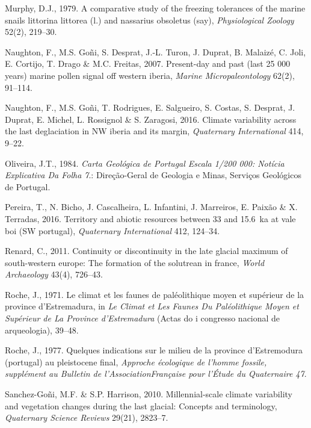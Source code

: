 \documentclass[12pt,twoside]{reedthesis}
\begin{document}
\leavevmode\hypertarget{ref-murphy1979}{}%
Murphy, D.J., 1979. A comparative study of the freezing tolerances of the marine snails littorina littorea (l.) and nassarius obsoletus (say), \emph{Physiological Zoology} 52(2), 219--30.

\leavevmode\hypertarget{ref-naughton2007}{}%
Naughton, F., M.S. Goñi, S. Desprat, J.-L. Turon, J. Duprat, B. Malaizé, C. Joli, E. Cortijo, T. Drago \& M.C. Freitas, 2007. Present-day and past (last 25 000 years) marine pollen signal off western iberia, \emph{Marine Micropaleontology} 62(2), 91--114.

\leavevmode\hypertarget{ref-naughton2016}{}%
Naughton, F., M.S. Goñi, T. Rodrigues, E. Salgueiro, S. Costas, S. Desprat, J. Duprat, E. Michel, L. Rossignol \& S. Zaragosi, 2016. Climate variability across the last deglaciation in NW iberia and its margin, \emph{Quaternary International} 414, 9--22.

\leavevmode\hypertarget{ref-oliveira1984}{}%
Oliveira, J.T., 1984. \emph{Carta Geológica de Portugal Escala 1/200 000: Notícia Explicativa Da Folha 7}.: Direção-Geral de Geologia e Minas, Serviços Geológicos de Portugal.

\leavevmode\hypertarget{ref-pereira2016}{}%
Pereira, T., N. Bicho, J. Cascalheira, L. Infantini, J. Marreiros, E. Paixão \& X. Terradas, 2016. Territory and abiotic resources between 33 and 15.6~ka at vale boi (SW portugal), \emph{Quaternary International} 412, 124--34.

\leavevmode\hypertarget{ref-renard2011}{}%
Renard, C., 2011. Continuity or discontinuity in the late glacial maximum of south-western europe: The formation of the solutrean in france, \emph{World Archaeology} 43(4), 726--43.

\leavevmode\hypertarget{ref-roche1971}{}%
Roche, J., 1971. Le climat et les faunes de paléolithique moyen et supérieur de la province d'Estremadura, in \emph{Le Climat et Les Faunes Du Paléolithique Moyen et Supérieur de La Province d'Estremadura} (Actas do i congresso nacional de arqueologia), 39--48.

\leavevmode\hypertarget{ref-roche1977}{}%
Roche, J., 1977. Quelques indications sur le milieu de la province d'Estremodura (portugal) au pleistocene final, \emph{Approche écologique de l'homme fossile, supplément au Bulletin de l'AssociationFrançaise pour l'Étude du Quaternaire 47}.

\leavevmode\hypertarget{ref-sanchez-goni2010}{}%
Sanchez-Goñi, M.F. \& S.P. Harrison, 2010. Millennial-scale climate variability and vegetation changes during the last glacial: Concepts and terminology, \emph{Quaternary Science Reviews} 29(21), 2823--7.
\end{document}
